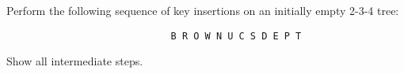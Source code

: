 Perform the following sequence of key insertions on an initially
empty 2-3-4 tree:
{\tt

\begin{verbatim}
                             B R O W N U C S D E P T

\end{verbatim}
}
Show all intermediate steps.

